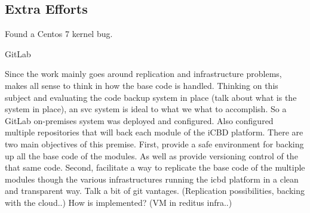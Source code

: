 \subsection{Extra Efforts}
\label{sub:extra_efforts}

Found a Centos 7 kernel bug.


GitLab

Since the work mainly goes around replication and infrastructure problems, makes all sense to think in how the base code is handled. Thinking on this subject and evaluating the code backup system in place (talk about what is the system in place), an svc system is ideal to what we what to accomplish.
So a GitLab on-premises system was deployed and configured. Also configured multiple repositories that will back each module of the iCBD platform.
There are two main objectives of this premise.
First, provide a safe environment for backing up all the base code of the modules. As well as provide versioning control of the that same code.
Second, facilitate a way to replicate the base code of the multiple modules though the various infrastructures running the icbd platform in a clean and transparent way.
Talk a bit of git vantages. (Replication possibilities, backing with the cloud..)
How is implemented? (VM in reditus infra..)



